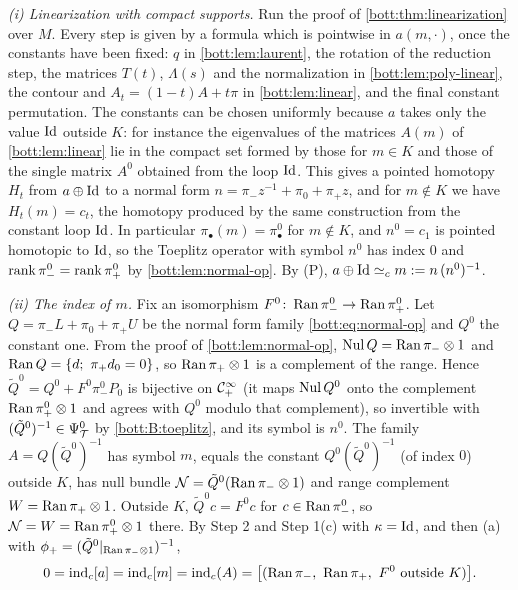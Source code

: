 \emph{(i) Linearization with compact supports.} Run the proof of
\cref{bott:thm:linearization} over $M$. Every step is given by a formula which is pointwise in
$a(m,\cdot)$, once the constants have been fixed: $q$ in \cref{bott:lem:laurent}, the rotation
of the reduction step, the matrices $T(t)$, $\Lambda(s)$ and the normalization in
\cref{bott:lem:poly-linear}, the contour and $A_t=(1-t)A+t\pi$ in \cref{bott:lem:linear}, and
the final constant permutation. The constants can be chosen uniformly because $a$ takes only
the value $\operatorname{Id}$ outside $K$: for instance the eigenvalues of the matrices $A(m)$ of
\cref{bott:lem:linear} lie in the compact set formed by those for $m\in K$ and those of the
single matrix $A^0$ obtained from the loop $\operatorname{Id}$. This gives a pointed homotopy $H_t$ from
$a\oplus\operatorname{Id}$ to a normal form $n=\pi_-z^{-1}+\pi_0+\pi_+z$, and for $m\notin K$ we have
$H_t(m)=c_t$, the homotopy produced by the same construction from the constant loop $\operatorname{Id}$. In
particular $\pi_\bullet(m)=\pi_\bullet^0$ for $m\notin K$, and $n^0=c_1$ is pointed homotopic
to $\operatorname{Id}$, so the Toeplitz operator with symbol $n^0$ has index $0$ and
$\operatorname{rank}\pi_-^0=\operatorname{rank}\pi_+^0$ by \cref{bott:lem:normal-op}. By (P),
$a\oplus\operatorname{Id}\simeq_c m:=n\,(n^0)^{-1}$.

\emph{(ii) The index of $m$.} Fix an isomorphism $F^0\colon\operatorname{Ran}\pi_-^0\to\operatorname{Ran}\pi_+^0$. Let
$Q=\pi_-L+\pi_0+\pi_+U$ be the normal form family \eqref{bott:eq:normal-op} and $Q^0$ the
constant one. From the proof of \cref{bott:lem:normal-op}, $\operatorname{Nul} Q=\operatorname{Ran}\pi_-\otimes1$ and
$\operatorname{Ran} Q=\{d;\ \pi_+d_0=0\}$, so $\operatorname{Ran}\pi_+\otimes1$ is a complement of the range. Hence
$\tilde Q^0=Q^0+F^0\pi_-^0P_0$ is bijective on $\mathcal{C}^\infty_+$ (it maps $\operatorname{Nul} Q^0$ onto the complement
$\operatorname{Ran}\pi^0_+\otimes1$ and agrees with $Q^0$ modulo that complement), so invertible with
$(\tilde Q^0)^{-1}\in\Psi^{0}_{\mathcal{T}}$ by \ref{bott:B:toeplitz}, and its symbol is $n^0$. The family
$A=Q(\tilde Q^0)^{-1}$ has symbol $m$, equals the constant $Q^0(\tilde Q^0)^{-1}$ (of index
$0$) outside $K$, has null bundle $\mathcal N=\tilde Q^0(\operatorname{Ran}\pi_-\otimes1)$ and range
complement $W=\operatorname{Ran}\pi_+\otimes1$. Outside $K$, $\tilde Q^0c=F^0c$ for $c\in\operatorname{Ran}\pi_-^0$, so
$\mathcal N=W=\operatorname{Ran}\pi_+^0\otimes1$ there. By Step 2 and Step 1(c) with $\kappa=\operatorname{Id}$, and then
(a) with $\phi_+=(\tilde Q^0|_{\operatorname{Ran}\pi_-\otimes1})^{-1}$,
\begin{equation*}
  0=\ind_c[a]=\ind_c[m]=\ind_c(A)=\bigl[(\Ran\pi_-,\ \Ran\pi_+,\ F^0\text{ outside }K)\bigr].
\end{equation*}

